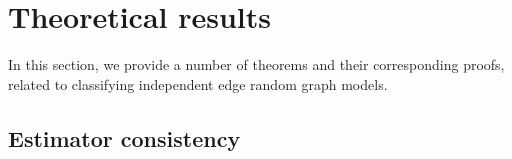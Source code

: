 







\section{Theoretical results} %
\label{sub:theoretical_results}

In this section, we provide a number of theorems and their corresponding proofs, related to classifying independent edge random graph models.

\subsection{Estimator consistency} %
\label{sub:estimator_consistency}

